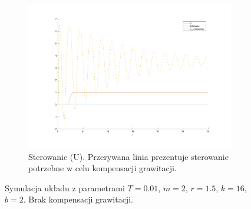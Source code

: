 \documentclass[a4paper, 10pt]{article}
\begin{document}
\begin{figure}
	\begin{subfigure}{.5\textwidth}
		\centering
		\includegraphics[width=\linewidth]{test_u}
		\caption{Sterowanie (U). Przerywana linia prezentuje sterowanie potrzebne w celu kompensacji grawitacji.}
		\label{fig:system_u}
	\end{subfigure}

	\caption{Symulacja układu z parametrami $T=0.01$, $m = 2$, $r = 1.5$, $k = 16$, $b = 2$. Brak kompensacji grawitacji.}
	\label{fig:system}
\end{figure}
\end{document}

